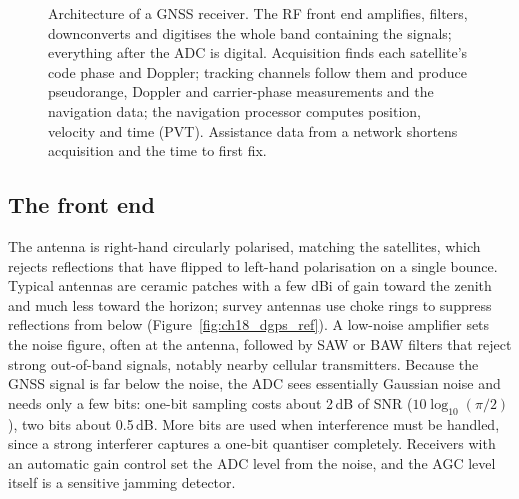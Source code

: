 \begin{figure}[htbp]
\caption{Architecture of a GNSS receiver. The RF front end amplifies, filters, downconverts
and digitises the whole band containing the signals; everything after the ADC is digital.
Acquisition finds each satellite's code phase and Doppler; tracking channels follow them and
produce pseudorange, Doppler and carrier-phase measurements and the navigation data; the
navigation processor computes position, velocity and time (PVT). Assistance data from a
network shortens acquisition and the time to first fix.}
\label{fig:ch18_gnss_rx}
\end{figure}

\subsection{The front end}

The antenna is right-hand circularly polarised, matching the satellites, which rejects
reflections that have flipped to left-hand polarisation on a single bounce. Typical antennas
are ceramic patches with a few dBi of gain toward the zenith and much less toward the
horizon; survey antennas use choke rings to suppress reflections from below
(Figure~\ref{fig:ch18_dgps_ref}). A low-noise amplifier sets the noise figure, often at the
antenna, followed by SAW or BAW filters that reject strong out-of-band signals, notably nearby
cellular transmitters. Because the GNSS signal is far below the noise, the ADC sees essentially
Gaussian noise and needs only a few bits: one-bit sampling costs about 2\,dB of SNR
($10\log_{10}(\pi/2)$), two bits about 0.5\,dB. More bits are used when interference must be
handled, since a strong interferer captures a one-bit quantiser completely. Receivers with an
automatic gain control set the ADC level from the noise, and the AGC level itself is a sensitive
jamming detector.


